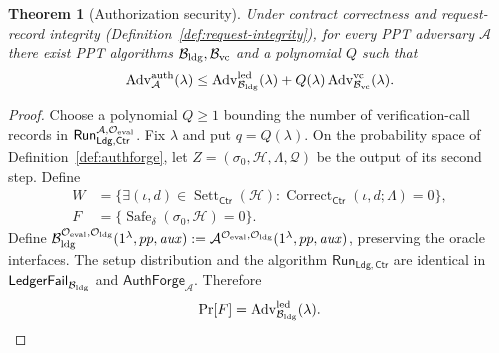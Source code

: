 \documentclass[10pt,letterpaper]{article}
\newtheorem{theorem}{Theorem}
\newcommand{\Ldg}{\mathsf{Ldg}}
\newcommand{\Ctr}{\mathsf{Ctr}}
\newcommand{\EvalO}{\mathcal O_{\rm eval}}
\newcommand{\LdgO}{\mathcal O_{\rm ldg}}
\begin{document}
\begin{theorem}[Authorization security]
\label{prop:integrity}
Under contract correctness and request-record integrity (Definition~\ref{def:request-integrity}), for every PPT adversary $\mathcal A$ there exist PPT algorithms $\mathcal B_{\rm ldg},\mathcal B_{\rm vc}$ and a polynomial $Q$ such that
\begin{equation}
 \operatorname{Adv}^{\rm auth}_{\mathcal A}(\lambda)
 \leq\operatorname{Adv}^{\rm led}_{\mathcal B_{\rm ldg}}(\lambda)
     +Q(\lambda)\operatorname{Adv}^{\rm vc}_{\mathcal B_{\rm vc}}(\lambda).
 \label{eq:authbound}
\end{equation}
\end{theorem}
\begin{proof}
Choose a polynomial $Q\geq1$ bounding the number of verification-call records in $\mathsf{Run}_{\Ldg,\Ctr}^{\mathcal A,\EvalO}$. Fix $\lambda$ and put $q=Q(\lambda)$. On the probability space of Definition~\ref{def:authforge}, let $Z=(\sigma_0,\mathcal H,\Lambda,\mathcal Q)$ be the output of its second step. Define
\begin{align*}
 W&=\{\exists(\iota,d)\in\operatorname{Sett}_{\Ctr}(\mathcal H):\operatorname{Correct}_{\Ctr}(\iota,d;\Lambda)=0\},\\
 F&=\{\operatorname{Safe}_\delta(\sigma_0,\mathcal H)=0\}.
\end{align*}
Define $\mathcal B_{\rm ldg}^{\EvalO,\LdgO}(1^\lambda,pp,\mathit{aux})
:=\mathcal A^{\EvalO,\LdgO}(1^\lambda,pp,\mathit{aux})$, preserving the oracle interfaces. The setup distribution and the algorithm $\mathsf{Run}_{\Ldg,\Ctr}$ are identical in $\mathsf{LedgerFail}_{\mathcal B_{\rm ldg}}$ and $\mathsf{AuthForge}_{\mathcal A}$. Therefore
\[
 \Pr[F]=\operatorname{Adv}^{\rm led}_{\mathcal B_{\rm ldg}}(\lambda).
\]


\end{proof}
\end{document}
